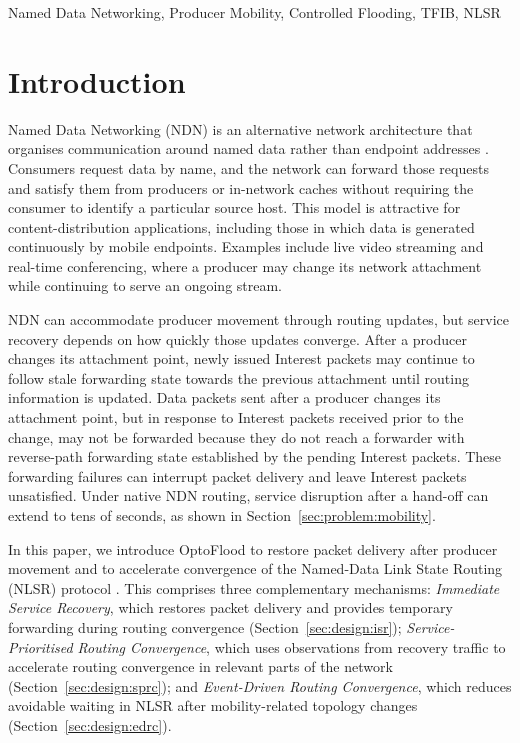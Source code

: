 \documentclass[10pt,conference]{IEEEtran}
\begin{document}

\begin{IEEEkeywords}
Named Data Networking, Producer Mobility, Controlled Flooding, TFIB, NLSR
\end{IEEEkeywords}


\section{Introduction}
\label{sec:introduction}

Named Data Networking (NDN) is an alternative network architecture that organises communication around named data rather than endpoint addresses \cite{jacobson:2009:named-content, zhang:2014:ndn}. Consumers request data by name, and the network can forward those requests and satisfy them from producers or in-network caches without requiring the consumer to identify a particular source host. This model is attractive for content-distribution applications, including those in which data is generated continuously by mobile endpoints. Examples include live video streaming and real-time conferencing, where a producer may change its network attachment while continuing to serve an ongoing stream.

NDN can accommodate producer movement through routing updates, but service recovery depends on how quickly those updates converge. After a producer changes its attachment point, newly issued Interest packets may continue to follow stale forwarding state towards the previous attachment until routing information is updated. Data packets sent after a producer changes its attachment point, but in response to Interest packets received prior to the change, may not be forwarded because they do not reach a forwarder with reverse-path forwarding state established by the pending Interest packets. These forwarding failures can interrupt packet delivery and leave Interest packets unsatisfied. Under native NDN routing, service disruption after a hand-off can extend to tens of seconds, as shown in Section~\ref{sec:problem:mobility}.

In this paper, we introduce OptoFlood to restore packet delivery after producer movement and to accelerate convergence of the Named-Data Link State Routing (NLSR) protocol \cite{hoque:2013:nlsr}. This comprises three complementary mechanisms: \emph{Immediate Service Recovery}, which restores packet delivery and provides temporary forwarding during routing convergence (Section~\ref{sec:design:isr}); \emph{Service-Prioritised Routing Convergence}, which uses observations from recovery traffic to accelerate routing convergence in relevant parts of the network (Section~\ref{sec:design:sprc}); and \emph{Event-Driven Routing Convergence}, which reduces avoidable waiting in NLSR after mobility-related topology changes (Section~\ref{sec:design:edrc}).
\end{document}
